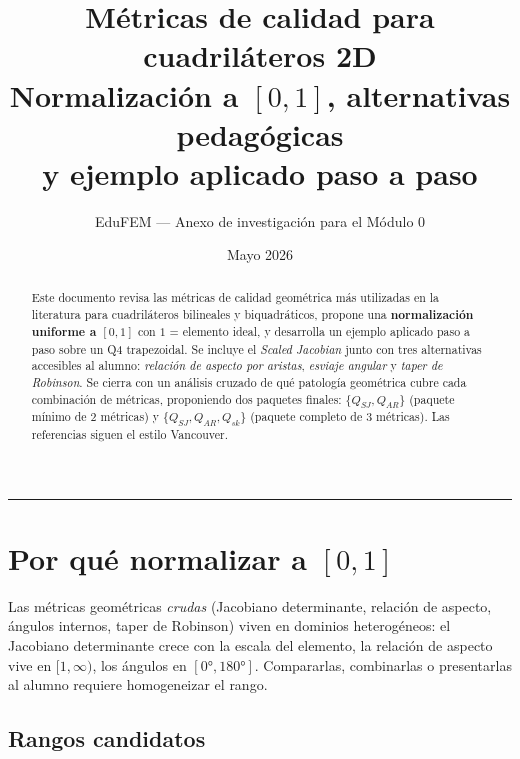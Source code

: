 \documentclass[11pt,a4paper]{article}
\title{\textbf{M\'etricas de calidad para cuadril\'ateros 2D}\\[2pt]
\large Normalizaci\'on a $[0,1]$, alternativas pedag\'ogicas\\ y ejemplo aplicado paso a paso}
\author{EduFEM --- Anexo de investigaci\'on para el M\'odulo 0}
\date{Mayo 2026}
\begin{document}
\maketitle

\begin{abstract}
\noindent
Este documento revisa las m\'etricas de calidad geom\'etrica m\'as utilizadas en la literatura para
cuadril\'ateros bilineales y biquadr\'aticos, propone una \textbf{normalizaci\'on uniforme a $[0,1]$}
con $1$ = elemento ideal, y desarrolla un ejemplo aplicado paso a paso sobre un Q4 trapezoidal.
Se incluye el \textit{Scaled Jacobian} junto con tres alternativas accesibles al alumno: \textit{relaci\'on
de aspecto por aristas}, \textit{esviaje angular} y \textit{taper de Robinson}. Se cierra con un
an\'alisis cruzado de qu\'e patolog\'ia geom\'etrica cubre cada combinaci\'on de m\'etricas,
proponiendo dos paquetes finales: \textbf{$\{Q_{SJ},Q_{AR}\}$} (paquete m\'inimo de 2 m\'etricas) y
\textbf{$\{Q_{SJ},Q_{AR},Q_{sk}\}$} (paquete completo de 3 m\'etricas). Las referencias siguen el
estilo Vancouver.
\end{abstract}

\tableofcontents
\vspace{6pt}\hrule\vspace{10pt}

\section{Por qu\'e normalizar a $[0,1]$}

Las m\'etricas geom\'etricas \textit{crudas} (Jacobiano determinante, relaci\'on de aspecto, \'angulos
internos, taper de Robinson) viven en dominios heterog\'eneos: el Jacobiano determinante crece con
la escala del elemento, la relaci\'on de aspecto vive en $[1,\infty)$, los \'angulos en $[0\si{\degree},180\si{\degree}]$.
Compararlas, combinarlas o presentarlas al alumno requiere homogeneizar el rango.

\subsection{Rangos candidatos}
\end{document}
